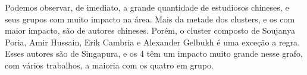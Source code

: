 Podemos observar, de imediato, a grande quantidade de estudiosos chineses, e seus grupos com muito impacto na área. Mais da metade dos clusters, e os com maior impacto, são de autores chineses. Porém, o cluster composto de Soujanya Poria, Amir Hussain, Erik Cambria e Alexander Gelbukh é uma exceção a regra. Esses autores são de Singapura, e os 4 têm um impacto muito grande nesse grafo, com vários trabalhos, a maioria com os quatro em grupo.